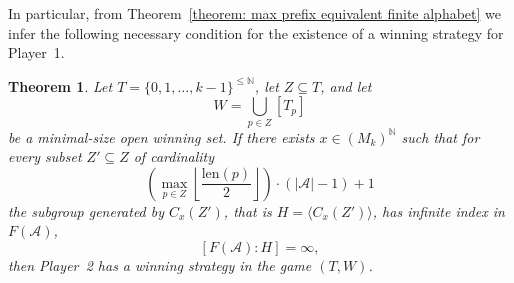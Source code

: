 \documentclass[a4,12pt]{article}%
\newtheorem{theorem}{Theorem}[section]
\begin{document}
In particular, from Theorem~\ref{theorem: max prefix equivalent finite alphabet}
we infer the following necessary condition for the existence of a
winning strategy for Player~1.

\begin{theorem}
\label{corollary: using max prefix codes}
Let $T=\{0,1,\dots,k-1\}^{\leq \mathbb{N}}$, let $Z \subseteq T$, and let
\[
W=\bigcup_{p\in Z}[T_p]
\]
be a minimal-size open winning set. If there exists
$x\in (M_k)^{\mathbb{N}}$ such that for every subset
$Z' \subseteq Z$ of cardinality
\[
\left(\max_{p\in Z} \left\lfloor \frac{\mathrm{len}(p)}{2} \right\rfloor \right)
\cdot (|\mathcal{A}|-1) + 1
\]
the subgroup generated by $C_x(Z')$, that is $H=\langle C_x(Z') \rangle$, has infinite index in $F(\mathcal{A})$,
\[
[F(\mathcal{A}) : H] = \infty,
\]
then Player~2 has a winning strategy in the game $(T,W)$.
\end{theorem}
\end{document}
